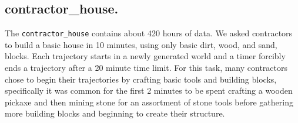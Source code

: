 \subsection{contractor\_house.}
\label{appendix:contractor_house_data}
The \texttt{contractor\_house} contains about 420 hours of data. We asked contractors to  build a basic house in 10 minutes, using only basic dirt, wood, and sand, blocks. Each trajectory starts in a newly generated world and a timer forcibly ends a trajectory after a 20 minute time limit. For this task, many contractors chose to begin their trajectories by crafting basic tools and building blocks, specifically it was common for the first 2 minutes to be spent crafting a wooden pickaxe and then mining stone for an assortment of stone tools before gathering more building blocks and beginning to create their structure.